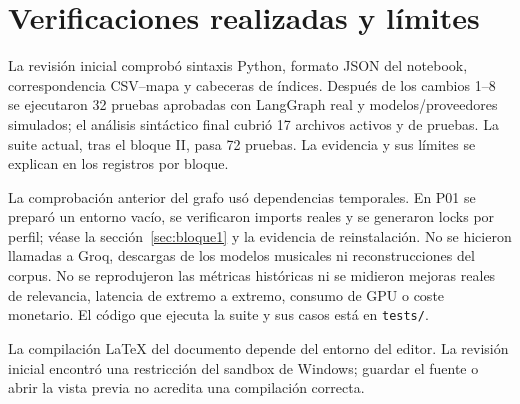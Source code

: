 \documentclass[11pt,a4paper]{article}
\newcommand{\code}[1]{\nolinkurl{#1}}
\begin{document}
\section{Verificaciones realizadas y límites}
La revisión inicial comprobó sintaxis Python, formato JSON del notebook,
correspondencia CSV--mapa y cabeceras de índices. Después de los cambios 1--8
se ejecutaron 32 pruebas aprobadas con LangGraph real y modelos/proveedores
simulados; el análisis sintáctico final cubrió 17 archivos activos y de pruebas.
La suite actual, tras el bloque II, pasa 72 pruebas. La evidencia y sus límites se explican en los registros por bloque.

La comprobación anterior del grafo usó dependencias temporales. En P01 se preparó un entorno vacío, se verificaron imports reales y se generaron locks por perfil; véase la sección~\ref{sec:bloque1} y la evidencia de reinstalación. No se hicieron
llamadas a Groq, descargas de los modelos musicales ni reconstrucciones del
corpus. No se reprodujeron las métricas históricas ni se midieron mejoras reales
de relevancia, latencia de extremo a extremo, consumo de GPU o coste monetario.
El código que ejecuta la suite y sus casos está en \code{tests/}.

La compilación LaTeX del documento depende del entorno del editor. La revisión
inicial encontró una restricción del sandbox de Windows; guardar el fuente o
abrir la vista previa no acredita una compilación correcta.














\appendix
\end{document}
